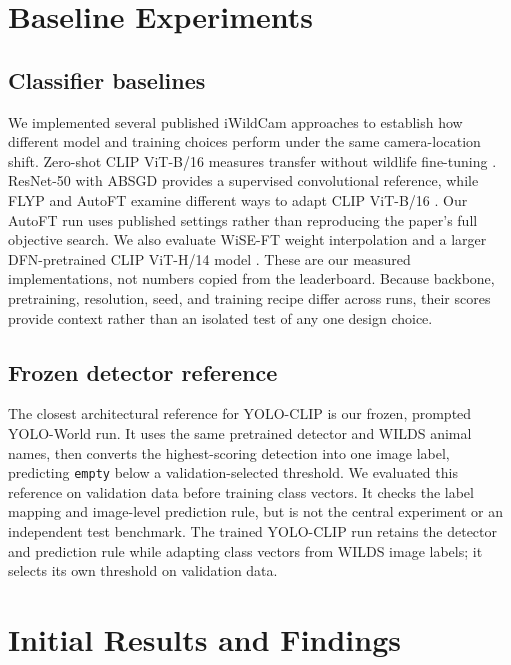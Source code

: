 \documentclass{article}
\begin{document}
\section{Baseline Experiments}
\subsection{Classifier baselines}
We implemented several published iWildCam approaches to establish how different
model and training choices perform under the same camera-location shift. Zero-shot
CLIP ViT-B/16 measures transfer without wildlife fine-tuning
\citep{radford2021learning}. ResNet-50 with ABSGD provides a supervised
convolutional reference, while FLYP and AutoFT examine different ways to adapt CLIP
ViT-B/16 \citep{he2015resnet,qi2023absgd,goyal2023flyp,choi2024autoft}. Our AutoFT run
uses published settings rather than reproducing the paper's full objective search.
We also evaluate WiSE-FT weight interpolation and a larger DFN-pretrained CLIP
ViT-H/14 model \citep{wortsman2022wiseft,fang2023dfn}. These are our measured
implementations, not numbers copied from the leaderboard. Because backbone,
pretraining, resolution, seed, and training recipe differ across runs, their scores
provide context rather than an isolated test of any one design choice.

\subsection{Frozen detector reference}
The closest architectural reference for YOLO-CLIP is our frozen, prompted YOLO-World
run. It uses the same pretrained detector and WILDS animal names, then converts the
highest-scoring detection into one image label, predicting \texttt{empty} below a
validation-selected threshold. We evaluated this reference on validation data
before training class vectors. It checks the label mapping and image-level
prediction rule, but is not the central experiment or an independent test
benchmark. The trained YOLO-CLIP run retains the detector and prediction rule
while adapting class vectors from WILDS image labels; it selects its own threshold
on validation data.

\section{Initial Results and Findings}
\begin{table}[ht]
\centering
\small

\caption{Image-level macro-F1 (\%). ID and OOD denote familiar and unseen camera
locations. The fixed-norm ResNet result is a three-seed mean; the other trained
classifier results are single runs. The YOLO-CLIP checkpoint was selected on IDVal
cross-entropy. Asterisks mark OODVal scores used to select each detector's
\texttt{empty} threshold, so they are tuning scores rather than independent
evaluations. Dashes denote unmeasured splits.}
\label{tab:baselines}
\end{table}
\end{document}
